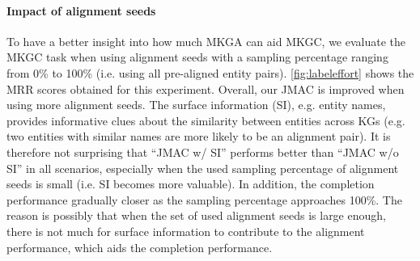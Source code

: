 \documentclass[11pt]{article}
\begin{document}
\paragraph{Impact of alignment seeds} To have a better insight into how much MKGA can aid MKGC,  we evaluate the MKGC task when using alignment seeds with a sampling percentage ranging from 0\% to 100\% (i.e. using all pre-aligned entity pairs). \autoref{fig:labeleffort} shows the  MRR scores obtained for this experiment.
Overall, our JMAC is improved when using more alignment seeds. 
The surface information (SI), e.g. entity names,
provides informative clues about the similarity between entities across KGs (e.g. two
entities with similar names are more likely to be an alignment pair). It is therefore not
surprising that ``{JMAC} w/ SI'' performs better than ``{JMAC} w/o SI'' in all scenarios, especially when the used sampling percentage of alignment seeds is small (i.e. SI becomes more valuable). In addition, the completion performance gradually closer as the sampling percentage  approaches 100\%. The reason is possibly that when the set of used alignment seeds is large enough, there is not much for surface information  to contribute to the alignment performance, which aids the completion performance. 
\end{document}
